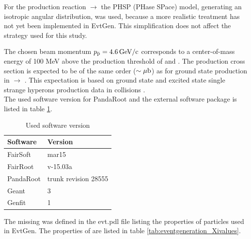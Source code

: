 For the production reaction \pbarpSystem $\rightarrow$ \excitedcascade\anticascade the PHSP (PHase SPace) model, 
generating an isotropic angular distribution, was used,
because a more realistic treatment has not yet been implemented in EvtGen. 
This simplification does not affect the strategy used for this study.

The chosen beam momentum $p_{\bar{\textnormal{p}}} = 4.6\, \textnormal{GeV/c}$ corresponds to a center-of-mass energy 
of 100 MeV above the production threshold of \excitedcascade and \anticascade.
The production cross section is expected to be of the same order ($\sim \mu\textnormal{b}$) as for ground 
state \cascade production in \pbarpSystem $\rightarrow$ \cascade\anticascade \cite{PANDAphysics2009}.
This expectation is based on ground state and excited state single strange hyperons production data in \pbarpSystem collisions \cite{CERN}.
\\

The used software version for PandaRoot and the external software package is listed in table \ref{tab:eventgeneration_software}.

\begin{table}[tb]
	\centering
	\caption{Used software version}
	\label{tab:eventgeneration_software}
	\begin{tabular}{ll}
		\hline
		Software & Version \\
		\hline
		\hline
		FairSoft & mar15\\
		FairRoot & v-15.03a \\
		PandaRoot & trunk revision 28555 \\
		Geant & 3\\
		Genfit & 1\\\hline
			 
	\end{tabular}
\end{table}


The missing \excitedcascade was defined in the evt.pdl file listing the properties of particles used in EvtGen. 
The properties of \excitedcascade are listed in table \ref{tab:eventgeneration_Xivalues}.


